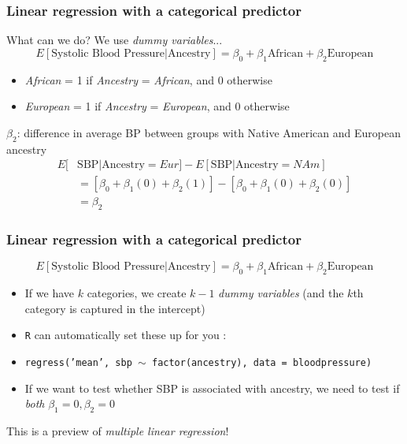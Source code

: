 \documentclass[12pt, 
hyperref={colorlinks=true, linkcolor=blue, urlcolor=cyan}]{beamer}
\begin{document}
\begin{frame}
\frametitle{Linear regression with a categorical predictor}
What can we do? We use \textit{dummy variables}...
$$E[\text{Systolic Blood Pressure}|\text{Ancestry}] = \beta_0 + \beta_1 \text{African} + \beta_2 \text{European}$$

\vspace{-0.5cm}
\begin{itemize}
\item \textit{African} = 1 if \textit{Ancestry} = \textit{African}, and 0 otherwise
\item \textit{European} = 1 if \textit{Ancestry} = \textit{European}, and 0 otherwise
\end{itemize}

$\beta_2$: difference in average BP between groups with Native American and European ancestry
\begin{align*}
E[&\text{SBP}|\text{Ancestry} = Eur] - E[\text{SBP}|\text{Ancestry} = NAm] \\
&= \left[\beta_0 + \beta_1(0) + \beta_2(1)\right] - \left[\beta_0 + \beta_1(0) + \beta_2(0) \right] \\
& = \beta_2
\end{align*}
\end{frame}

\begin{frame}
\frametitle{Linear regression with a categorical predictor}
$$E[\text{Systolic Blood Pressure}|\text{Ancestry}] = \beta_0 + \beta_1 \text{African} + \beta_2 \text{European}$$

\vspace{-0.3cm}
\begin{itemize}
\item If we have $k$ categories, we create $k-1$ \textit{dummy variables} (and the $k$th category is captured in the intercept)
\item \texttt{R} can automatically set these up for you :
\item[] \texttt{regress('mean', sbp $\sim$ factor(ancestry), data = bloodpressure)}
\item If we want to test whether SBP is associated with ancestry, we need to test if \textit{both} $\beta_1 = 0, \beta_2 = 0$
\end{itemize}

This is a preview of \textit{multiple linear regression}!

\end{frame}
\end{document}
